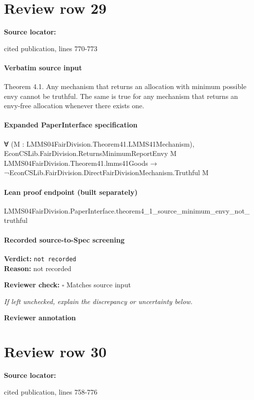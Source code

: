 \documentclass[10pt]{article}
\newcommand{\reviewerbox}{%
  \par\noindent\fbox{\parbox{0.96\linewidth}{\rule{0pt}{0.38in}}}\par
}
\newcommand{\reviewmatch}[1]{%
  \par\noindent\textbf{Reviewer check:} $\square$\; #1\par
  \noindent\emph{If left unchecked, explain the discrepancy or uncertainty below.}\par
}
\begin{document}
\section*{Review row 29}
\textbf{Source locator:} {\footnotesize\raggedright cited publication, lines 770-\allowbreak{}773\par}
\paragraph{Verbatim source input}
\begin{ReviewVerbatim}
Theorem 4.1. Any mechanism that returns an allocation
with minimum possible envy cannot be truthful. The same is
true for any mechanism that returns an envy-free allocation
whenever there exists one.
\end{ReviewVerbatim}


\paragraph{Expanded PaperInterface specification}
\begin{ReviewVerbatim}
∀ (M : LMMS04FairDivision.Theorem41.LMMS41Mechanism),
  EconCSLib.FairDivision.ReturnsMinimumReportEnvy M LMMS04FairDivision.Theorem41.lmms41Goods →
    ¬EconCSLib.FairDivision.DirectFairDivisionMechanism.Truthful M
\end{ReviewVerbatim}

\paragraph{Lean proof endpoint (built separately)}\begin{ReviewVerbatim}
LMMS04FairDivision.PaperInterface.theorem4_1_source_minimum_envy_not_truthful
\end{ReviewVerbatim}

\paragraph{Recorded source-to-Spec screening}
\textbf{Verdict:} \texttt{not recorded}
\\
\textbf{Reason:} not recorded
\reviewmatch{Matches source input}
\noindent\textbf{Reviewer annotation}\par
\reviewerbox
\clearpage
\hypertarget{source-claim-41e9057437421225}{}
\section*{Review row 30}
\textbf{Source locator:} {\footnotesize\raggedright cited publication, lines 758-\allowbreak{}776\par}
\end{document}
